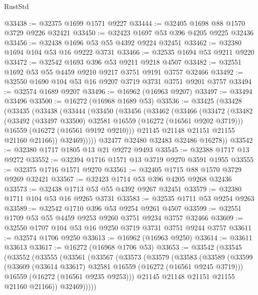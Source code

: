 \begin{lexlean}{RustStd}
\begin{coremodule}
@33438 := @32375 @1699 @1571 @9227
@33444 := @32405 @1698 @88 @1570 @3729 @9226 @32421
@33450 := @32423 @1697 @53 @396 @4205 @9225 @32436
@33456 := @32438 @1696 @53 @55 @4392 @9224 @32451
@33462 := @32380 @1694 @104 @53 @16 @9222 @3731
@33466 := @32535 @1694 @53 @9211 @9220
@33472 := @32542 @1693 @396 @53 @9211 @9218 @4507
@33482 := @32551 @1692 @53 @55 @4459 @9210 @9217 @3751 @9191 @3757 @32466
@33492 := @32550 @1690 @104 @53 @16 @9207 @3719 @3731 @3751 @9201 @3757
@33494 := @32574 @1689 @9207
@33496 := @16962 (@16963 @9207)
@33497 := @33494 @33496
@33500 := @16272 (@16968 @1689 @53)
@33536 := @33425
    (@33428
      (@33435
        (@33438
          (@33444
            (@33450
              (@33456
                (@33462
                  (@33466
                    (@33472
                      (@33482
                        (@33492 (@33497 @33500) @32581 @16559 (@16272 (@16561 @9202 @3719)))
                        @16559
                        (@16272 (@16561 @9192 @9210)))
                      @21145
                      @21148
                      @21151
                      @21155
                      @21160
                      @21166))
                  @32469)))))
        @32477
        @32480
        @32483
        @32486
        @16278))
@33542 := @32380 @1717 @1805 @13 @21 @9272 @9493
@33545 := @32388 @1717 @13 @9272
@33552 := @32394 @1716 @1571 @13 @3719 @9270 @3591 @1955
@33555 := @32375 @1716 @1571 @9270
@33561 := @32405 @1715 @88 @1570 @3729 @9269 @32421
@33567 := @32423 @1714 @53 @396 @4205 @9268 @32436
@33573 := @32438 @1713 @53 @55 @4392 @9267 @32451
@33579 := @32380 @1711 @104 @53 @16 @9265 @3731
@33583 := @32535 @1711 @53 @9254 @9263
@33589 := @32542 @1710 @396 @53 @9254 @9261 @4507
@33599 := @32551 @1709 @53 @55 @4459 @9253 @9260 @3751 @9234 @3757 @32466
@33609 := @32550 @1707 @104 @53 @16 @9250 @3719 @3731 @3751 @9244 @3757
@33611 := @32574 @1706 @9250
@33613 := @16962 (@16963 @9250)
@33614 := @33611 @33613
@33617 := @16272 (@16968 @1706 @53)
@33653 := @33542
    (@33545
      (@33552
        (@33555
          (@33561
            (@33567
              (@33573
                (@33579
                  (@33583
                    (@33589
                      (@33599
                        (@33609 (@33614 @33617) @32581 @16559 (@16272 (@16561 @9245 @3719)))
                        @16559
                        (@16272 (@16561 @9235 @9253)))
                      @21145
                      @21148
                      @21151
                      @21155
                      @21160
                      @21166))
                  @32469)))))

\end{coremodule}
\end{lexlean}
